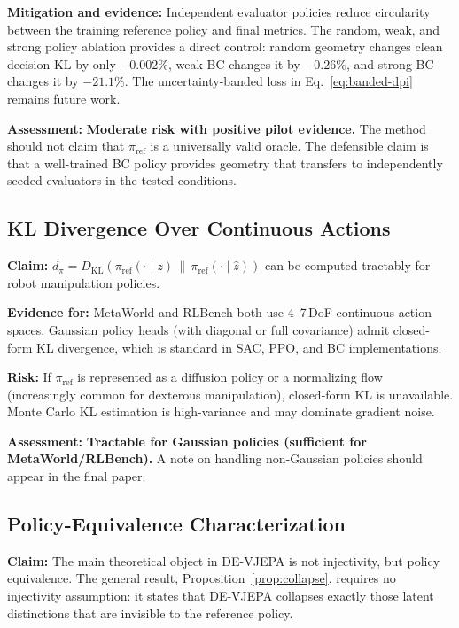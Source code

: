 \documentclass[10pt,twocolumn]{article}
\theoremstyle{tightstyle}
\begin{document}
\medskip
\textbf{Mitigation and evidence:}
Independent evaluator policies reduce circularity between the training reference
policy and final metrics. The random, weak, and strong policy ablation provides a
direct control: random geometry changes clean decision KL by only $-0.002\%$, weak
BC changes it by $-0.26\%$, and strong BC changes it by $-21.1\%$.
The uncertainty-banded loss in Eq.~\eqref{eq:banded-dpi} remains future work.

\medskip
\textbf{Assessment:}
\textcolor{cautionamber}{\textbf{Moderate risk with positive pilot evidence.}}
The method should not claim that $\pi_{\mathrm{ref}}$ is a universally valid oracle.
The defensible claim is that a well-trained BC policy provides geometry that
transfers to independently seeded evaluators in the tested conditions.

\subsection{KL Divergence Over Continuous Actions}

\textbf{Claim:} $d_\pi = D_{\mathrm{KL}}(\pi_{\text{ref}}(\cdot\mid z) \,\|\, \pi_{\text{ref}}(\cdot\mid\hat{z}))$
can be computed tractably for robot manipulation policies.

\medskip
\textbf{Evidence for:}
MetaWorld and RLBench both use 4--7\,DoF continuous action spaces.
Gaussian policy heads (with diagonal or full covariance) admit closed-form KL
divergence, which is standard in SAC, PPO, and BC implementations.

\medskip
\textbf{Risk:} If $\pi_{\text{ref}}$ is represented as a diffusion policy or a
normalizing flow (increasingly common for dexterous manipulation), closed-form KL
is unavailable. Monte Carlo KL estimation is high-variance and may dominate gradient
noise.

\medskip
\textbf{Assessment:} \textcolor{feasgreen}{\textbf{Tractable for Gaussian policies
(sufficient for MetaWorld/RLBench).}} A note on handling non-Gaussian policies should
appear in the final paper.

\subsection{Policy-Equivalence Characterization}

\textbf{Claim:}
The main theoretical object in DE-VJEPA is not injectivity, but policy equivalence.
The general result, Proposition~\ref{prop:collapse}, requires no injectivity
assumption: it states that DE-VJEPA collapses exactly those latent distinctions
that are invisible to the reference policy.
\end{document}
